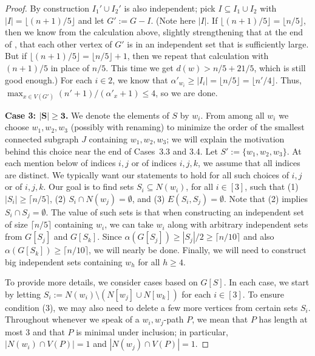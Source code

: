 \documentclass[11pt]{article}
\theoremstyle{definition}
\newcommand\floor[1]{\lfloor#1\rfloor}
\renewcommand\ge\geqslant
\renewcommand\le\leqslant
\begin{document}
\begin{proof}
	By construction $I_1'\cup I_2'$ is also independent; 
	pick $I\subseteq I_1\cup I_2$ with $|I| = \floor{(n+1)/5}$ and let $G':= G-I$.  (Note here $|I|$.  If $\floor{(n+1)/5}=\floor{n/5}$, then we
	know from the calculation above, slightly strengthening that at the end of , 
	that each other vertex of $G'$ is in an independent set that is sufficiently large.  But if $\floor{(n+1)/5} = \floor{n/5}+1$, then we repeat
	that calculation with $(n+1)/5$ in place of $n/5$.  This time we get $d(w) > n/5+21/5$, which is still good enough.)
	For each $i\in 2$, we know that $\alpha'_{w_i}\ge |I_i| = \floor{n/5} = \floor{n'/4}$.  
Thus, $\max_{x\in V(G')}(n'+1)/(\alpha'_x+1)\le 4$, so we are done.


\textbf{Case 3: $\bm{|S|\ge 3}$.}
We denote the elements of $S$ by $w_i$.  From among all $w_i$ we choose $w_1,w_2,w_3$ (possibly with renaming) to minimize the order of the 
smallest connected subgraph $J$ containing $w_1,w_2,w_3$; we will explain the motivation behind this choice near the end of Cases~3.3 and 3.4.
%
Let $S':=\{w_1,w_2,w_3\}$.  At each mention below of indices $i,j$ or of indices $i,j,k$, we assume that all indices are distinct.
We typically want our statements to hold for all such choices of $i,j$ or of $i,j,k$.
Our goal is to find sets $S_i\subseteq N(w_i)$, for all $i\in [3]$, such that
(1) $|S_i|\ge \lceil n/5\rceil$, (2) $S_i \cap N(w_j) = \emptyset$, and 
(3) $E(S_i,S_j)=\emptyset$.  Note that (2) implies $S_i\cap S_j = \emptyset$.
The value of such sets is that when constructing an independent set of size $\lceil n/5\rceil$ containing $w_i$, we can take $w_i$ along with 
arbitrary independent sets from $G[S_j]$ and $G[S_k]$.  Since $\alpha(G[S_j])\ge |S_j|/2 \ge \lceil n/10\rceil$ and also $\alpha(G[S_k])\ge \lceil 
n/10\rceil$, we will nearly be done.  Finally, we will need to construct big independent sets containing $w_h$ for all $h\ge 4$.

To provide more details, we consider cases based on $G[S]$.
In each case, we start by letting $S_i:=N(w_i)\setminus (N[w_j]\cup N[w_k])$ for each $i\in [3]$.
To ensure condition (3), we may also need to delete a few more vertices from certain sets $S_i$.
Throughout whenever we speak of a $w_i,w_j$-path $P$, we mean that $P$ has length at most $3$ and that $P$ is minimal under inclusion; in particular,
	$|N(w_i)\cap V(P)|=1$ and $|N(w_j)\cap V(P)|=1$.


\end{proof}
\end{document}
